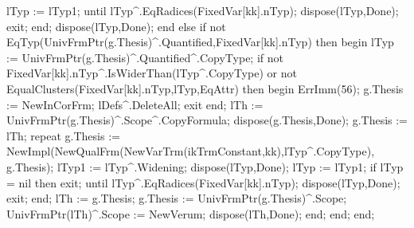               lTyp := lTyp1;
            until lTyp^.EqRadices(FixedVar[kk].nTyp);
            dispose(lTyp,Done); exit;
         end;
         dispose(lTyp,Done);
         end
         else if not EqTyp(UnivFrmPtr(g.Thesis)^.Quantified,FixedVar[kk].nTyp) then
         begin
            lTyp := UnivFrmPtr(g.Thesis)^.Quantified^.CopyType;
            if not FixedVar[kk].nTyp^.IsWiderThan(lTyp^.CopyType)
               or not EqualClusters(FixedVar[kk].nTyp,lTyp,EqAttr) then
            begin ErrImm(56); g.Thesis := NewInCorFrm; lDefs^.DeleteAll; exit end;
            lTh := UnivFrmPtr(g.Thesis)^.Scope^.CopyFormula;
            dispose(g.Thesis,Done);
            g.Thesis := lTh;
            repeat
               g.Thesis := 
                  NewImpl(NewQualFrm(NewVarTrm(ikTrmConstant,kk),lTyp^.CopyType),
                          g.Thesis);
               lTyp1 := lTyp^.Widening;
               dispose(lTyp,Done);
               lTyp := lTyp1;
               if lTyp = nil then exit;
            until lTyp^.EqRadices(FixedVar[kk].nTyp);
            dispose(lTyp,Done);
            exit;
         end;
         lTh := g.Thesis;
         g.Thesis := UnivFrmPtr(g.Thesis)^.Scope;
         UnivFrmPtr(lTh)^.Scope := NewVerum; dispose(lTh,Done);
      end;
   end;
end;
\eatline
{}\nwendcode{}\nwdocspar
